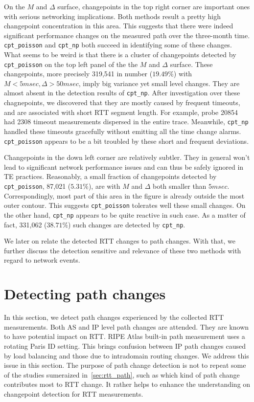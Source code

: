 On the $M$ and $\Delta$ surface, changepoints in the top right corner are important ones with serious networking implications.
Both methods result a pretty high changepoint concentration in this area.
This suggests that there were indeed significant performance changes on the measured path over the three-month time.
\texttt{cpt\_poisson} and \texttt{cpt\_np} both succeed in identifying some of these changes.
What seems to be weird is that there is a cluster of changepoints detected by \texttt{cpt\_poisson} on the top left panel of the the $M$ and $\Delta$ surface.
These changepoints, more precisely 319,541 in number ($19.49\%$) with $M<5msec, \Delta>50msec$, imply big variance yet small level changes.
They are almost absent in the detection results of \texttt{cpt\_np}.
After investigation over these chagnepoints, we discovered that they are mostly caused by frequent timeouts, and are associated with short RTT segment length. For example, probe 20854 had 2308 timeout measurements dispersed in the entire trace.
Meanwhile, \texttt{cpt\_np} handled these timeouts gracefully without emitting all the time change alarms.
\texttt{cpt\_poisson} appears to be a bit troubled by these short and frequent deviations.

Changepoints in the down left corner are relatively subtler.
They in general won't lead to significant network performance issues and can thus be safely ignored in TE practices.
Reasonably, a small fraction of changepoints detected by \texttt{cpt\_poisson}, 87,021 ($5.31\%$), are with $M$ and $\Delta$ both smaller than $5msec$.
Correspondingly, most part of this area in the figure is already outside the most outer contour.
This suggests \texttt{cpt\_poisson} tolerates well these small changes.
On the other hand, \texttt{cpt\_np} appears to be quite reactive in such case.
As a matter of fact, 331,062 ($38.71\%$) such changes are detected by \texttt{cpt\_np}.

We later on relate the detected RTT changes to path changes.
With that, we further discuss the detection sensitive and relevance of these two methods with regard to network events.

\section{Detecting path changes}
\label{sec:path}

In this section, we detect path changes experienced by the collected RTT measurements.
Both AS and IP level path changes are attended.
They are known to have potential impact on RTT.
RIPE Atlas built-in path measurement uses a rotating Paris ID setting.
This brings confusion between IP path changes caused by load balancing and those due to intradomain routing changes.
We address this issue in this section.
The purpose of path change detection is not to repeat some of the studies sumeraized in~\ref{sec:rtt_path}, 
such as which kind of path change contributes most to RTT change.
It rather helps to enhance the understanding on changepoint detection for RTT measurements.


